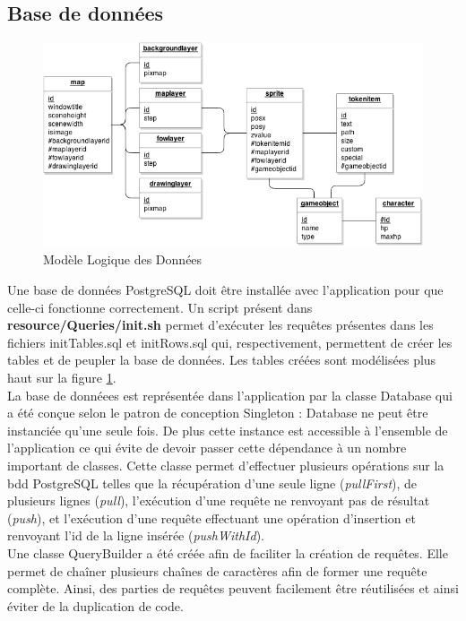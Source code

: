 \subsection {Base de données}

\begin{figure}[h!]
    \centering
    \includegraphics[width=\textwidth]{img/bdd_MLD.png}
    \caption{Modèle Logique des Données}
    \label{fig:bddmld}
\end{figure}

Une base de données PostgreSQL doit être installée avec l'application pour que celle-ci fonctionne correctement. Un script présent dans \textbf{resource/Queries/init.sh} permet d'exécuter les requêtes présentes dans les fichiers initTables.sql et initRows.sql qui, respectivement, permettent de créer les tables et de peupler la base de données. Les tables créées sont modélisées plus haut sur la figure \ref{fig:bddmld}.\\



La base de donnéees est représentée dans l'application par la classe Database qui a été conçue selon le patron de conception Singleton : Database ne peut être instanciée qu'une seule fois. De plus cette instance est accessible à l'ensemble de l'application ce qui évite de devoir passer cette dépendance à un nombre important de classes. Cette classe permet d'effectuer plusieurs opérations sur la bdd PostgreSQL telles que la récupération d'une seule ligne (\emph{pullFirst}), de plusieurs lignes (\emph{pull}), l'exécution d'une requête ne renvoyant pas de résultat (\emph{push}), et l'exécution d'une requête effectuant une opération d'insertion et renvoyant l'id de la ligne insérée (\emph{pushWithId}).\\

Une classe QueryBuilder a été créée afin de faciliter la création de requêtes. Elle permet de chaîner plusieurs chaînes de caractères afin de former une requête complète. Ainsi, des parties de requêtes peuvent facilement être réutilisées et ainsi éviter de la duplication de code.

